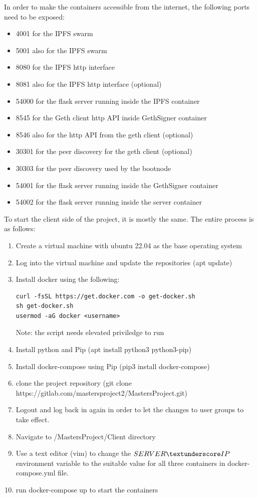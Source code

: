 \documentclass{article}
\begin{document}
In order to make the containers accessible from the internet, the following ports need to be exposed:
\begin{itemize}
    \item 4001 for the IPFS swarm
    \item 5001 also for the IPFS swarm
    \item 8080 for the IPFS http interface
    \item 8081 also for the IPFS http interface (optional)
    \item 54000 for the flask server running inside the IPFS container
    \item 8545 for the Geth client http API inside GethSigner container
    \item 8546 also for the http API from the geth client (optional)
    \item 30301 for the peer discovery for the geth client (optional)
    \item 30303 for the peer discovery used by the bootnode
    \item 54001 for the flask server running inside the GethSigner container
    \item 54002 for the flask server running inside the server container 
\end{itemize}

To start the client side of the project, it is mostly the same. The entire process is as follows:
\begin{enumerate}
    \item Create a virtual machine with ubuntu 22.04 as the base operating system
    \item Log into the virtual machine and update the repositories (apt update)
    \item Install docker using the following:
    \begin{lstlisting}
curl -fsSL https://get.docker.com -o get-docker.sh
sh get-docker.sh
usermod -aG docker <username>
    \end{lstlisting}
    Note: the script needs elevated priviledge to run

    \item Install python and Pip (apt install python3 python3-pip)
    \item Install docker-compose using Pip (pip3 install docker-compose)
    \item clone the project repository (git clone https://gitlab.com/mastersproject2/MastersProject.git)
    \item Logout and log back in again in order to let the changes to user groups to take effect.
    \item Navigate to /MastersProject/Client directory
    \item Use a text editor (vim) to change the $SERVER \textunderscore IP$ environment variable to the suitable value for all three containers in docker-compose.yml file.
    \item run docker-compose up to start the containers
\end{enumerate}
\end{document}
